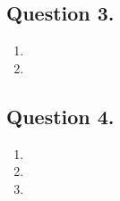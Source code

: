\documentclass[10pt]{article}
\begin{document}
    \subsection*{\textbf{Question 3.}}
    \begin{enumerate}[label=(\alph*)]
        \item
        \item
    \end{enumerate}

    \subsection*{\textbf{Question 4.}}
    \begin{enumerate}[label=(\alph*)]
        \item
        \item
        \item
    \end{enumerate}
\end{document}
